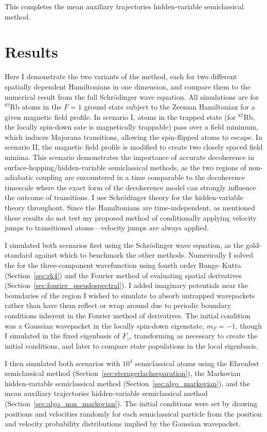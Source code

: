 This completes the mean auxiliary trajectories hidden-variable semiclassical method.

\section{Results}\label{sec:HVSC_results}

Here I demonstrate the two variants of the method, each for two different spatially dependent Hamiltonians in one dimension, and compare them to the numerical result from the full Schr\"odinger wave equation. All simulations are for $^{87}$Rb atoms in the $F=1$ ground state subject to the Zeeman Hamiltonian for a given magnetic field profile. In scenario I, atoms in the trapped state (for $^{87}$Rb, the locally spin-down sate is magnetically trappable) pass over a field minimum, which induces Majorana transitions, allowing the spin-flipped atoms to escape. In scenario II, the magnetic field profile is modified to create two closely spaced field minima. This scenario demonstrates the importance of accurate decoherence in surface-hopping/hidden-variable semiclassical methods, as the two regions of non-adiabatic coupling are encountered in a time comparable to the decoherence timescale where the exact form of the decoherence model can strongly influence the outcome of transitions. I use Schr\"odinger theory for the hidden-variable theory throughout. Since the Hamiltonians are time-independent, as mentioned these results do not test my proposed method of conditionally applying velocity jumps to transitioned atoms---velocity jumps are always applied.

I simulated both scenarios first using the Schr\"odinger wave equation, as the gold-standard against which to benchmark the other methods. Numerically I solved the for the three-component wavefunction using fourth order Runge--Kutta (Section~\ref{sec:rk4}) and the Fourier method of evaluating spatial derivatives (Section~\ref{sec:fourier_pseudospectral}). I added imaginary potentials near the boundaries of the region I wished to simulate to absorb untrapped wavepackets rather than have them reflect or wrap around due to periodic boundary conditions inherent in the Fourier method of derivatives. The initial condition was a Gaussian wavepacket in the locally spin-down eigenstate, $m_F = -1$, though I simulated in the fixed eigenbasis of $\hat F_z$, transforming as necessary to create the initial conditions, and later to compare state populations in the local eigenbasis.

I then simulated both scenarios with $10^4$ semiclassical atoms using the Ehrenfest semiclassical method (Section~\ref{sec:sterngerlachseparation}), the Markovian hidden-variable semiclassical method (Section~\ref{sec:algo_markovian}), and the mean auxiliary trajectories hidden-variable semiclassical method (Section~\ref{sec:algo_non_markovian}). The initial conditions were set by drawing positions and velocities randomly for each semiclassical particle from the position and velocity probability distributions implied by the Gaussian wavepacket.

